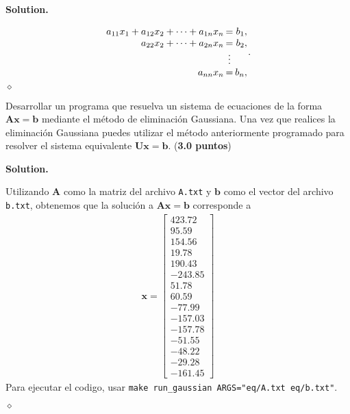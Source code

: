 \documentclass{article}
\theoremstyle{problemstyle}
\newenvironment{solution}{%
  \begin{mdframed}[linewidth=0.8pt,linecolor=Gray,backgroundcolor=Gray!5,roundcorner=5pt]%
  \noindent\textbf{Solution.}%
}{%
\hfill $ \diamond $ 
  \end{mdframed}%
}
\begin{document}
\begin{solution}
	\begin{align*}
		\arraycolsep=1pt
		\begin{array}{rcr}
			a_{11}x_{1} + a_{12}x_{2} + \cdots + a_{1n}x_{n} & =      & b_{1}, \\
			a_{22}x_{2} + \cdots + a_{2n}x_{n}               & =      & b_{2}, \\
			                                                 & \vdots &        \\
			a_{nn}x_{n}                                      & =      & b_{n},
		\end{array}.
	\end{align*}
\end{solution}
\begin{problem}
Desarrollar un programa que resuelva un sistema de ecuaciones de la forma $ \mathbf{Ax} = \mathbf{b} $ mediante el m\'etodo de eliminaci\'on Gaussiana. Una vez que realices la eliminaci\'on Gaussiana puedes utilizar el m\'etodo anteriormente programado para resolver el sistema equivalente $ \mathbf{Ux} = \mathbf{b} $. (\textbf{3.0 puntos})
\end{problem}
\begin{solution}
  Utilizando $ \mathbf{A} $ como la matriz del archivo \texttt{A.txt} y $ \mathbf{b} $ como el vector del archivo \texttt{b.txt}, obtenemos que la soluci\'on a $ \mathbf{Ax} = \mathbf{b} $ corresponde a
    \begin{align*}
      \mathbf{x} =\begin{bmatrix}
    423.72 \\
    95.59 \\
    154.56 \\
    19.78 \\
    190.43 \\
    -243.85 \\
    51.78 \\
    60.59 \\
    -77.99 \\
    -157.03 \\
    -157.78 \\
    -51.55 \\
    -48.22 \\
    -29.28 \\
    -161.45
\end{bmatrix} 
    \end{align*}
  Para ejecutar el codigo, usar \texttt{make run\_gaussian ARGS="eq/A.txt eq/b.txt"}.

\end{solution}



\end{document}
